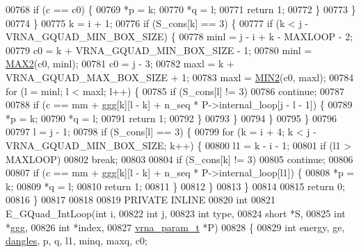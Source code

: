 \begin{DoxyCode}
00768       \textcolor{keywordflow}{if} (c == c0) \{
00769         *p  = k;
00770         *q  = l;
00771         \textcolor{keywordflow}{return} 1;
00772       \}
00773     \}
00774   \}
00775   k = i + 1;
00776   \textcolor{keywordflow}{if} (S\_cons[k] == 3) \{
00777     \textcolor{keywordflow}{if} (k < j - VRNA\_GQUAD\_MIN\_BOX\_SIZE) \{
00778       minl  = j - i + k - MAXLOOP - 2;
00779       c0    = k + VRNA\_GQUAD\_MIN\_BOX\_SIZE - 1;
00780       minl  = \hyperlink{group__utils_ga33297b3679c713b0c4d897cd0fe3b122}{MAX2}(c0, minl);
00781       c0    = j - 3;
00782       maxl  = k + VRNA\_GQUAD\_MAX\_BOX\_SIZE + 1;
00783       maxl  = \hyperlink{group__utils_gae0b9cd0ce090bd69b951aa73e8fa4f7d}{MIN2}(c0, maxl);
00784       \textcolor{keywordflow}{for} (l = minl; l < maxl; l++) \{
00785         \textcolor{keywordflow}{if} (S\_cons[l] != 3)
00786           \textcolor{keywordflow}{continue};
00787 
00788         \textcolor{keywordflow}{if} (c == mm + ggg[k][l - k] + n\_seq * P->internal\_loop[j - l - 1]) \{
00789           *p  = k;
00790           *q  = l;
00791           \textcolor{keywordflow}{return} 1;
00792         \}
00793       \}
00794     \}
00795   \}
00796 
00797   l = j - 1;
00798   \textcolor{keywordflow}{if} (S\_cons[l] == 3) \{
00799     \textcolor{keywordflow}{for} (k = i + 4; k < j - VRNA\_GQUAD\_MIN\_BOX\_SIZE; k++) \{
00800       l1 = k - i - 1;
00801       \textcolor{keywordflow}{if} (l1 > MAXLOOP)
00802         \textcolor{keywordflow}{break};
00803 
00804       \textcolor{keywordflow}{if} (S\_cons[k] != 3)
00805         \textcolor{keywordflow}{continue};
00806 
00807       \textcolor{keywordflow}{if} (c == mm + ggg[k][l - k] + n\_seq * P->internal\_loop[l1]) \{
00808         *p  = k;
00809         *q  = l;
00810         \textcolor{keywordflow}{return} 1;
00811       \}
00812     \}
00813   \}
00814 
00815   \textcolor{keywordflow}{return} 0;
00816 \}
00817 
00818 
00819 PRIVATE INLINE
00820 \textcolor{keywordtype}{int}
00821 E\_GQuad\_IntLoop(\textcolor{keywordtype}{int}           i,
00822                 \textcolor{keywordtype}{int}           j,
00823                 \textcolor{keywordtype}{int}           type,
00824                 \textcolor{keywordtype}{short}         *S,
00825                 \textcolor{keywordtype}{int}           *ggg,
00826                 \textcolor{keywordtype}{int}           *index,
00827                 \hyperlink{group__energy__parameters_structvrna__param__s}{vrna\_param\_t}  *P)
00828 \{
00829   \textcolor{keywordtype}{int}   energy, ge, \hyperlink{group__model__details_ga72b511ed1201f7e23ec437e468790d74}{dangles}, p, q, l1, minq, maxq, c0;

\end{DoxyCode}
